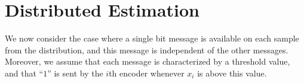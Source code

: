 \documentclass[letterpaper, conference]{IEEEtran}      %
\newcommand{\sgn}{\mathrm{sgn} }
\begin{document}

\section{Distributed Estimation \label{sec:distributed}}
We now consider the case where a single bit message is available on each sample from the distribution, and this message is independent of the other messages. Moreover, we assume that each message is characterized by a threshold value, and that ``$1$'' is sent by the $i$th encoder whenever $x_i$ is above this value. 
\end{document}
